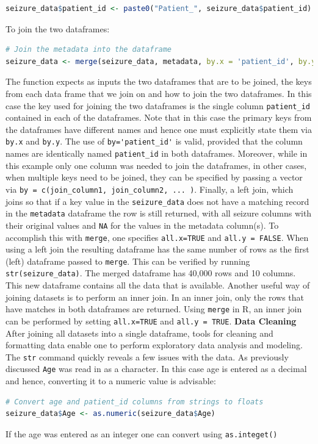 \begin{lstlisting}[language=R]
seizure_data$patient_id <- paste0("Patient_", seizure_data$patient_id)
\end{lstlisting}
To join the two dataframes:
\begin{lstlisting}[language=R]
# Join the metadata into the dataframe
seizure_data <- merge(seizure_data, metadata, by.x = 'patient_id', by.y = 'ID', all.x = TRUE, all.y = FALSE)
\end{lstlisting}
The function expects as inputs the two dataframes that are to be joined, the keys from each data frame that we join on and how to join the two dataframes. In this case the key used for joining the two dataframes is the single column \verb|patient_id| contained in each of the dataframes. Note that in this case the primary keys from the dataframes have different names and hence one must explicitly state them via \verb|by.x| and \verb|by.y|. The use of \verb|by='patient_id'| is valid, provided that the column names are identically named \verb|patient_id| in both dataframes. Moreover, while in this example only one column was needed to join the dataframes, in other cases, when multiple keys need to be joined, they can be specified by passing a vector via \verb|by = c(join_column1, join_column2, ... )|.
Finally, a left join, which joins so that if a key value in the \verb|seizure_data| does not have a matching record in the \verb|metadata| dataframe the row is still returned, with all seizure columns with their original values and \verb|NA| for the values in the metadata column(s). To accomplish this with \verb|merge|, one specifies \verb|all.x=TRUE| and \verb|all.y = FALSE|. When using a left join the resulting dataframe has the same number of rows as the first (left) dataframe passed to \verb|merge|. This can be verified by running \verb|str(seizure_data)|. The merged dataframe has 40,000 rows and 10 columns. This new dataframe contains all the data that is available. Another useful way of joining datasets is to perform an inner join. In an inner join, only the rows that have matches in both dataframes are returned. Using \verb|merge| in R, an inner join can be performed by setting \verb|all.x=TRUE| and \verb|all.y = TRUE|.
\newline
\newline
\textbf{Data Cleaning}
\newline
\newline
After joining all datasets into a single dataframe, tools for cleaning and formatting data enable one to perform exploratory data analysis and modeling. The \verb|str| command quickly reveals a few issues with the data. As previously discussed \verb|Age| was read in as a character. In this case age is entered as a decimal and hence, converting it to a numeric value is advisable:
\begin{lstlisting}[language=R]
# Convert age and patient_id columns from strings to floats
seizure_data$Age <- as.numeric(seizure_data$Age)
\end{lstlisting}
If the age was entered as an integer one can convert using \verb|as.integet()|

